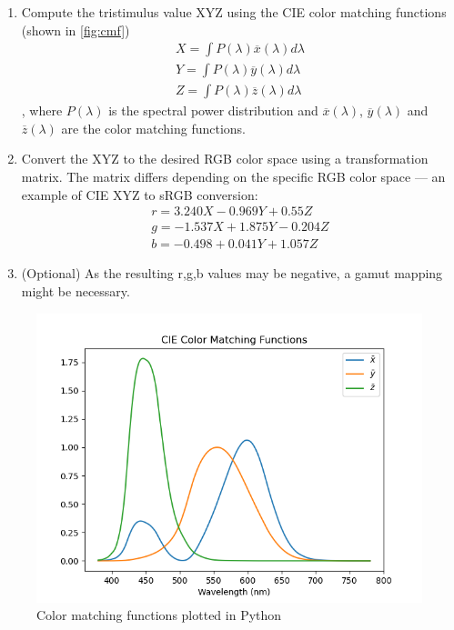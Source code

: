 \begin{enumerate}
	\item Compute the tristimulus value XYZ using the CIE color matching functions (shown in \autoref{fig:cmf})
	\begin{align*} 
	X=\int P(\lambda)\overline{x}(\lambda)d\lambda\\
	Y=\int P(\lambda)\overline{y}(\lambda)d\lambda\\
	Z=\int P(\lambda)\overline{z}(\lambda)d\lambda
	\end{align*} 
	, where $P(\lambda)$ is the spectral power distribution and $\overline{x}(\lambda)$, $\overline{y}(\lambda)$ and $\overline{z}(\lambda)$ are the color matching functions.
	\item Convert the XYZ to the desired RGB color space using a transformation matrix. The matrix differs depending on the specific RGB color space --- an example of CIE XYZ to sRGB conversion:
	\begin{align*}
	r=3.240X-0.969Y+0.55Z\\
	g=-1.537X+1.875Y-0.204Z\\
	b=-0.498+0.041Y+1.057Z
	\end{align*}
	\item (Optional) As the resulting r,g,b values may be negative, a gamut mapping might be necessary.
\end{enumerate}

\begin{figure}[httpb]
	\centering
	\includegraphics[width=.8\linewidth]{img/cmf.png}
	\caption[CMF]{Color matching functions plotted in Python\footnotemark}
	\label{fig:cmf}
\end{figure}

